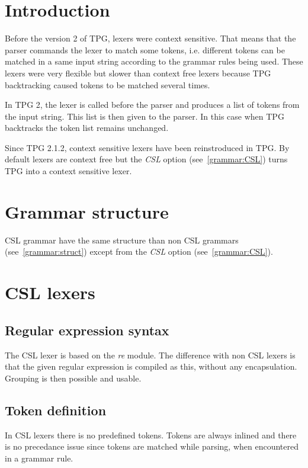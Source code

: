 \section{Introduction}

Before the version 2 of TPG, lexers were context sensitive.
That means that the parser commands the lexer to match some tokens, i.e. different tokens can be matched in a same input string according to the grammar rules being used.
These lexers were very flexible but slower than context free lexers because TPG backtracking caused tokens to be matched several times.

In TPG 2, the lexer is called before the parser and produces a list of tokens from the input string.
This list is then given to the parser.
In this case when TPG backtracks the token list remains unchanged.

Since TPG 2.1.2, context sensitive lexers have been reinstroduced in TPG.
By default lexers are context free but the \emph{CSL} option (see~\ref{grammar:CSL}) turns TPG into a context sensitive lexer.

\section{Grammar structure}

CSL grammar have the same structure than non CSL grammars (see~\ref{grammar:struct}) except from the \emph{CSL} option (see~\ref{grammar:CSL}).

\section{CSL lexers}

\subsection{Regular expression syntax}

The CSL lexer is based on the \emph{re} module.
The difference with non CSL lexers is that the given regular expression is compiled as this, without any encapsulation.
Grouping is then possible and usable.

\subsection{Token definition}

In CSL lexers there is no predefined tokens.
Tokens are always inlined and there is no precedance issue since tokens are matched while parsing, when encountered in a grammar rule.

